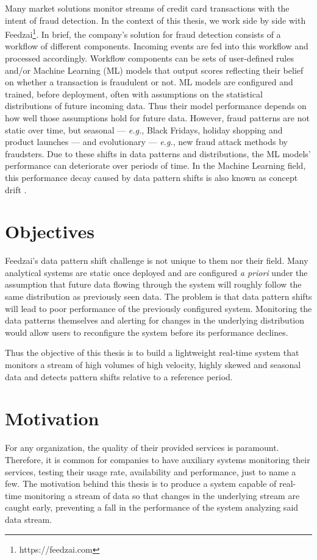 Many market solutions monitor streams of credit card transactions with the intent of fraud detection. In the context of this thesis, we work side by side with Feedzai\footnote{https://feedzai.com}. In brief, the company's solution for fraud detection consists of a workflow of different components. Incoming events are fed into this workflow and processed accordingly. Workflow components can be sets of user-defined rules and/or Machine Learning (ML) models that output scores reflecting their belief on whether a transaction is fraudulent or not. ML models are configured and trained,  before deployment, often with assumptions on the statistical distributions of future incoming data. Thus their model performance depends on how well those assumptions hold for future data. However, fraud patterns are not static over time, but seasonal --- \textit{e.g.}, Black Fridays, holiday shopping and product launches --- and evolutionary --- \textit{e.g.}, new fraud attack methods by fraudsters. Due to these shifts in data patterns and distributions, the ML models' performance can deteriorate over periods of time. In the Machine Learning field, this performance decay caused by data pattern shifts is also known as concept drift \cite{drift, gama-drift}.

\section{Objectives} \label{sec:objectives}
Feedzai's data pattern shift challenge is not unique to them nor their field. Many analytical systems are static once deployed and are configured \textit{a priori} under the assumption that future data flowing through the system will roughly follow the same distribution as previously seen data.
The problem is that data pattern shifts will lead to poor performance of the previously configured system. Monitoring the data patterns themselves and alerting for changes in the underlying distribution would allow users to reconfigure the system before its performance declines.

Thus the objective of this thesis is to build a lightweight real-time system that monitors a stream of high volumes of high velocity, highly skewed and seasonal data and detects pattern shifts relative to a reference period.

\section{Motivation} \label{sec:motivation}
For any organization, the quality of their provided services is paramount. Therefore, it is common for companies to have auxiliary systems monitoring their services, testing their usage rate, availability and performance, just to name a few. The motivation behind this thesis is to produce a system capable of real-time monitoring a stream of data so that changes in the underlying stream are caught early, preventing a fall in the performance of the system analyzing said data stream. 

